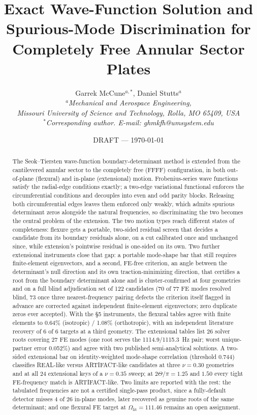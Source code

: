 \documentclass[11pt]{article}
\title{\bfseries Exact Wave-Function Solution and Spurious-Mode Discrimination
for Completely Free Annular Sector Plates}
\author{Garrek McCune$^{a,*}$, Daniel Stutts$^{a}$\\
\small\itshape $^a$Mechanical and Aerospace Engineering,\\
Missouri University of Science and Technology, Rolla, MO 65409, USA\\
\small\upshape $^*$Corresponding author. E-mail: ghmkfh@umsystem.edu}
\date{DRAFT --- \today}
\begin{document}
\maketitle

\begin{abstract}
The Seok--Tiersten wave-function boundary-determinant method is extended
from the cantilevered annular sector to the completely free (FFFF)
configuration, in both out-of-plane (flexural) and in-plane (extensional)
motion. Frobenius-series wave functions satisfy the radial-edge conditions
exactly; a two-edge variational functional enforces the circumferential
conditions and decouples into even and odd parity blocks. Releasing both
circumferential edges leaves them enforced only weakly, which admits
spurious determinant zeros alongside the natural frequencies, so
discriminating the two becomes the central problem of the extension. The
two motion types reach different states of completeness: flexure gets a
portable, two-sided residual screen that decides a candidate from its
boundary residuals alone, on a cut calibrated once and unchanged since,
while extension's pointwise residual is one-sided on its own. Two further
extensional instruments close that gap: a portable mode-shape bar that
still requires finite-element eigenvectors, and a second, FE-free
criterion, an angle between the determinant's null direction and its own
traction-minimizing direction, that certifies a root from the boundary
determinant alone and is cluster-confirmed at four geometries and on a
full blind adjudication set of 122 candidates (70 of 77 FE modes resolved
blind, 73 once three nearest-frequency pairing defects the criterion itself
flagged in advance are corrected against independent finite-element
eigenvectors; zero duplicate zeros ever accepted). With the \S5 instruments, the
flexural tables agree with finite elements to
0.64\% (isotropic) / 1.08\% (orthotropic), with an independent literature
recovery of 6 of 6 targets at a third geometry. The extensional tables
list 26 solver roots covering
27 FE modes (one root serves the 1114.9/1115.3~Hz pair; worst
unique-partner error 0.052\%) and agree with two published
semi-analytical solutions. A two-sided
extensional bar on identity-weighted mode-shape correlation (threshold
$0.744$) classifies REAL-like versus ARTIFACT-like candidates at three
$\nu=0.30$ geometries and at all 24 extensional keys of a $\nu=0.35$
sweep; at $2\Theta/\pi=1.25$ and $1.50$ every tight FE-frequency match is
ARTIFACT-like. Two limits are reported with the rest: the tabulated
frequencies are not a certified single-pass product, since a fully-default
detector misses 4 of 26 in-plane modes, later recovered as genuine roots of
the same determinant; and one flexural FE target at
$\Omega_{\mathrm{lit}}=111.46$ remains an open assignment.
\end{abstract}
\end{document}
